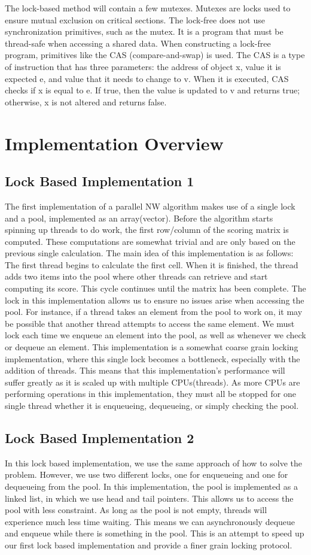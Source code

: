 \documentclass[letterpaper, 10 pt, conference]{IEEEconf}
\begin{document}
The lock-based method will contain a few mutexes. Mutexes are locks used to ensure mutual exclusion on critical sections. The lock-free does not use synchronization primitives, such as the mutex. It is a program that must be thread-safe when accessing a shared data. When constructing a lock-free program, primitives like the CAS (compare-and-swap) is used. The CAS is a type of instruction that has three parameters: the address of object x, value it is expected e, and value that it needs to change to v. When it is executed, CAS checks if x is equal to e. If true, then the value is updated to v and returns true; otherwise, x is not altered and returns false. 

\section{Implementation Overview}
\subsection{Lock Based Implementation 1}
The first implementation of a parallel NW algorithm makes use of a single lock and a pool, implemented as an array(vector). Before the algorithm starts spinning up threads to do work, the first row/column of the scoring matrix is computed. These computations are somewhat trivial and are only based on the previous single calculation. The main idea of this implementation is as follows: The first thread begins to calculate the first cell. When it is finished, the thread adds two items into the pool where other threads can retrieve and start computing its score. This cycle continues until the matrix has been complete.
The lock in this implementation allows us to ensure no issues arise when accessing the pool. For instance, if a thread takes an element from the pool to work on, it may be possible that another thread attempts to access the same element. We must lock each time we enqueue an element into the pool, as well as whenever we check or dequeue an element. 
This implementation is a somewhat coarse grain locking implementation, where this single lock becomes a bottleneck, especially with the addition of threads. This means that this implementation's performance will suffer greatly as it is scaled up with multiple CPUs(threads). As more CPUs are performing operations in this implementation, they must all be stopped for one single thread whether it is enqueueing, dequeueing, or simply checking the pool. 
\subsection{Lock Based Implementation 2}
In this lock based implementation, we use the same approach of how to solve the problem. However, we use two different locks, one for enqueueing and one for dequeueing from the pool. In this implementation, the pool is implemented as a linked list, in which we use head and tail pointers. This allows us to access the pool with less constraint. As long as the pool is not empty, threads will experience much less time waiting. This means we can asynchronously dequeue and enqueue while there is something in the pool. 
This is an attempt to speed up our first lock based implementation and provide a finer grain locking protocol. 
\end{document}
